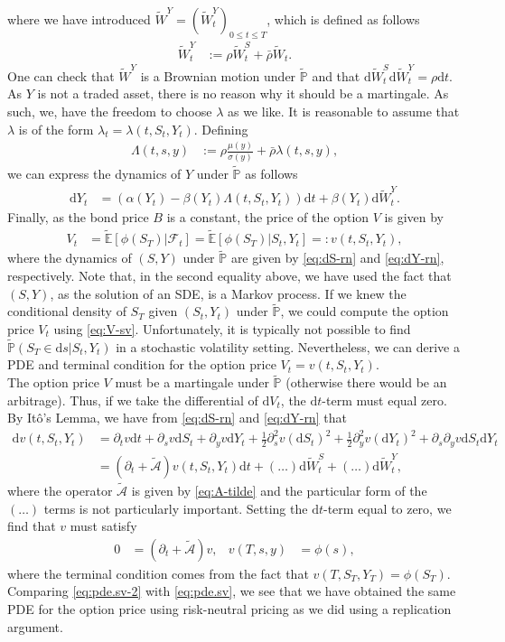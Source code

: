 \documentclass[12pt]{book}
\numberwithin{equation}{chapter}
\theoremstyle{plain}
\numberwithin{theorem}{section}
\theoremstyle{definition}
\numberwithin{exercise}{chapter}
\newcommand{\<}{\langle}
\renewcommand{\>}{\rangle}
\renewcommand{\(}{\left(}
\renewcommand{\)}{\right)}
\renewcommand{\[}{\left[}
\renewcommand{\]}{\right]}
\newcommand\Eb{\mathds{E}}
\newcommand\Pb{\mathds{P}}
\newcommand\Ac{\mathscr{A}}
\newcommand\Fc{\mathscr{F}}
\newcommand\sig{\sigma}
\newcommand\Lam{\Lambda}
\newcommand\lam{\lambda}
\newcommand\rhob{\bar{\rho}}
\newcommand\Ebt{\widetilde{\Eb}}
\newcommand\Pbt{\widetilde{\Pb}}
\newcommand\Act{\widetilde{\Ac}}
\newcommand\Wt{\widetilde{W}}
\renewcommand\d{\partial}
\newcommand\dd{\mathrm{d}}
\theoremstyle{definition}
\numberwithin{question}{section}
\begin{document}
where we have introduced $\Wt^Y = (\Wt_t^Y)_{0 \leq t \leq T}$, which is defined as follows
\begin{align}
\Wt_t^Y
	&:=	\rho  \Wt_t^S + \rhob \Wt_t .
\end{align}
One can check that $\Wt^Y$ is a Brownian motion under $\Pbt$ and that $\dd \Wt_t^S \dd \Wt_t^Y = \rho \dd t$.  As $Y$ is not a traded asset, there is no reason why it should be a martingale.  As such, we, have the freedom to choose $\lam$ as we like.  It is reasonable to assume that $\lam$ is of the form $\lam_t = \lam(t,S_t,Y_t)$.  Defining
\begin{align}
\Lam(t,s,y)
	&:=	\rho \frac{ \mu(y) }{\sig(y)} + \rhob  \lam(t,s,y) ,
\end{align}
we can express the dynamics of $Y$ under $\Pbt$ as follows
\begin{align}
\dd Y_t
	&=	( \alpha(Y_t) - \beta(Y_t) \Lam(t,S_t,Y_t) ) \dd t + \beta(Y_t) \dd \Wt_t^Y . \label{eq:dY-rn}
\end{align}
Finally, as the bond price $B$ is a constant, the price of the option $V$ is given by
\begin{align}
V_t
	&=	\Ebt[ \phi(S_T) | \Fc_t ]
	=		\Ebt[ \phi(S_T) | S_t, Y_t ] =: v(t,S_t,Y_t) , \label{eq:V-sv}
\end{align}
where the dynamics of $(S,Y)$ under $\Pbt$ are given by \eqref{eq:dS-rn} and \eqref{eq:dY-rn}, respectively.
Note that, in the second equality above, we have used the fact that $(S,Y)$, as the solution of an SDE, is a Markov process.
If we knew the conditional density of $S_T$ given $(S_t,Y_t)$ under $\Pbt$, we could compute the option price $V_t$ using \eqref{eq:V-sv}.
Unfortunately, it is typically not possible to find $\Pbt( S_T \in \dd s | S_t, Y_t)$ in a stochastic volatility setting.
Nevertheless, we can derive a PDE and terminal condition for the option price $V_t = v(t,S_t,Y_t)$.
\\[0.5em]
The option price $V$ must be a martingale under $\Pbt$ (otherwise there would be an arbitrage).  Thus, if we take the differential of $\dd V_t$, the $\dd t$-term must equal zero.  By It\^o's Lemma, we have from \eqref{eq:dS-rn} and \eqref{eq:dY-rn} that
\begin{align}
\dd v(t,S_t,Y_t)
	&=	\d_t v \dd t + \d_s v \dd S_t + \d_y v \dd Y_t + \tfrac{1}{2} \d_s^2 v (\dd S_t )^2 + \tfrac{1}{2} \d_y^2 v (\dd Y_t )^2 + \d_s \d_y v \dd S_t \dd Y_t \\
	&=	( \d_t + \Act ) v(t,S_t,Y_t) \dd t + ( \ldots ) \dd \Wt_t^S + ( \ldots ) \dd \Wt_t^Y ,
\end{align}
where the operator $\Act$ is given by \eqref{eq:A-tilde}  and the particular form of the $( \ldots )$ terms is not particularly important.  Setting the $\dd t$-term equal to zero, we find that $v$ must satisfy
\begin{align}
0
	&=	(\d_t + \Act) v , &
v(T,s,y)
	&=	\phi(s) , \label{eq:pde.sv-2}
\end{align}
where the terminal condition comes from the fact that $v(T,S_T,Y_T) = \phi(S_T)$.
Comparing \eqref{eq:pde.sv-2} with \eqref{eq:pde.sv}, we see that we have obtained the same PDE for the option price using risk-neutral pricing as we did using a replication argument.
\end{document}
